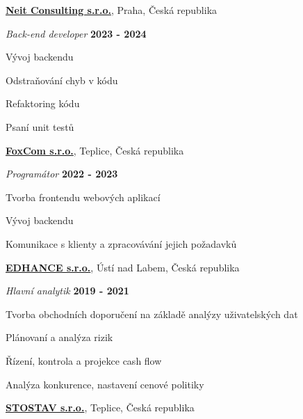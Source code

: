 \documentclass[10pt]{article}
\newenvironment{outerlist}[0]%
        {\begin{itemize}}
	{\end{itemize}
         \vspace{-.6\baselineskip}}
\newenvironment{innerlist}[0]%
        {\begin{compactitem}}
	{\end{compactitem}}
\newcommand{\blankline}{\quad\pagebreak[2]}
\begin{document}
\href{http://www.neit.cz}{\textbf{Neit Consulting s.r.o.}}, 
Praha, Česká republika

\begin{outerlist}
	\item[] \textit{Back-end developer}%
		\hfill \textbf{2023 - 2024}
	\begin{innerlist}
		\item Vývoj backendu
		\item Odstraňování chyb v kódu
		\item Refaktoring kódu		
		\item Psaní unit testů		
		
	\end{innerlist}
\end{outerlist}
\blankline

\href{http://www.foxcom.eu}{\textbf{FoxCom s.r.o.}}, 
Teplice, Česká republika

\begin{outerlist}
	\item[] \textit{Programátor}%
		\hfill \textbf{2022 - 2023}
	\begin{innerlist}
		\item Tvorba frontendu webových aplikací
		\item Vývoj backendu
		\item Komunikace s klienty a zpracovávání jejich požadavků		
		
	\end{innerlist}
\end{outerlist}
\blankline


\href{http://www.edhance.cz}{\textbf{EDHANCE s.r.o.}}, 
Ústí nad Labem, Česká republika

\begin{outerlist}
	\item[] \textit{Hlavní analytik}%
		\hfill \textbf{2019 - 2021}
	\begin{innerlist}
		\item Tvorba obchodních doporučení na základě analýzy uživatelských dat
		\item Plánovaní a analýza rizik
		\item Řízení, kontrola a projekce cash flow
		\item Analýza konkurence, nastavení cenové politiky
		
	\end{innerlist}
\end{outerlist}
\blankline


\href{http://www.stostav.cz}{\textbf{STOSTAV s.r.o.}}, 
Teplice, Česká republika
\end{document}
